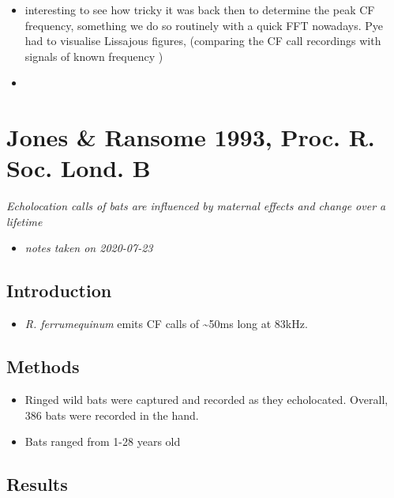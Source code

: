 \documentclass[
]{book}
\providecommand{\tightlist}{%
  \setlength{\itemsep}{0pt}\setlength{\parskip}{0pt}}
\begin{document}
\begin{itemize}
\item
  interesting to see how tricky it was back then to determine the peak CF frequency, something we do so routinely with a quick FFT nowadays. Pye had to visualise Lissajous figures, (comparing the CF call recordings with signals of known frequency )
\item
\end{itemize}

\hypertarget{jones-ransome-1993-proc.-r.-soc.-lond.-b}{%
\chapter{Jones \& Ransome 1993, Proc. R. Soc. Lond. B}\label{jones-ransome-1993-proc.-r.-soc.-lond.-b}}


\emph{Echolocation calls of bats are influenced by maternal effects and change over a lifetime} \citep{jonesransome1993}

\begin{itemize}
\tightlist
\item
  \emph{notes taken on 2020-07-23}
\end{itemize}

\hypertarget{introduction-3}{%
\section{Introduction}\label{introduction-3}}

\begin{itemize}
\tightlist
\item
  \emph{R. ferrumequinum} emits CF calls of \textasciitilde50ms long at 83kHz.
\end{itemize}

\hypertarget{methods-6}{%
\section{Methods}\label{methods-6}}

\begin{itemize}
\tightlist
\item
  Ringed wild bats were captured and recorded as they echolocated. Overall, 386 bats were recorded in the hand.
\item
  Bats ranged from 1-28 years old
\end{itemize}

\hypertarget{results-6}{%
\section{Results}\label{results-6}}
\end{document}
